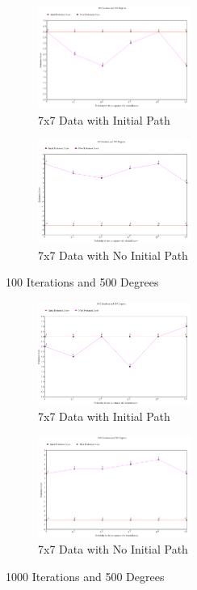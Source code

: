 \documentclass[11pt, oneside]{article}   	%
\begin{document}
\begin{figure}[H]
\centering
\begin{subfigure}{.5\textwidth}
	\centering
	\includegraphics[width=50mm]{7x7lowIhighT.png}
	\caption{7x7 Data with Initial Path}
	\label{fig:method}
\end{subfigure}%
\begin{subfigure}{.5\textwidth}
	\centering
	\includegraphics[width=50mm]{7x7lowIhighTPath.png}
	\caption{7x7 Data with No Initial Path}
	\label{fig:method}
\end{subfigure}
\caption{100 Iterations and 500 Degrees}
\end{figure}

\begin{figure}[H]
\centering
\begin{subfigure}{.5\textwidth}
	\centering
	\includegraphics[width=50mm]{7x7highIhighT.png}
	\caption{7x7 Data with Initial Path}
	\label{fig:method}
\end{subfigure}%
\begin{subfigure}{.5\textwidth}
	\centering
	\includegraphics[width=50mm]{7x7highIhighTPath.png}
	\caption{7x7 Data with No Initial Path}
	\label{fig:method}
\end{subfigure}
\caption{1000 Iterations and 500 Degrees}
\end{figure}
\end{document}
